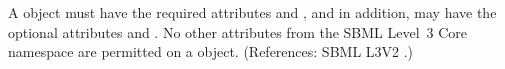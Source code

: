 A \Trigger object must have the required attributes
 and , and in addition, may have the
optional attributes   and .  No other
attributes from the SBML Level~3 Core namespace are permitted on a \Trigger
object.  (References: SBML L3V2 .)
